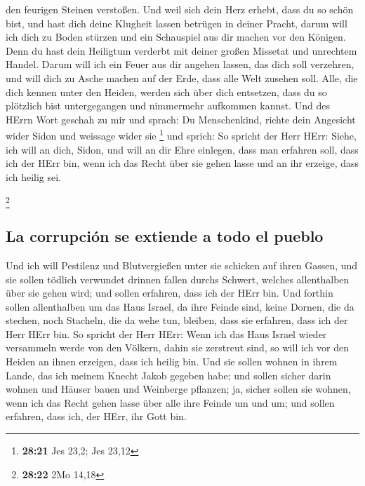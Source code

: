 den feurigen Steinen verstoßen.  Und weil sich dein Herz
erhebt, dass du so schön bist, und hast dich deine Klugheit lassen
betrügen in deiner Pracht, darum will ich dich zu Boden stürzen und ein
Schauspiel aus dir machen vor den Königen.  Denn du hast
dein Heiligtum verderbt mit deiner großen Missetat und unrechtem Handel.
Darum will ich ein Feuer aus dir angehen lassen, das dich soll
verzehren, und will dich zu Asche machen auf der Erde, dass alle Welt
zusehen soll.  Alle, die dich kennen unter den Heiden,
werden sich über dich entsetzen, dass du so plötzlich bist untergegangen
und nimmermehr aufkommen kannst.  Und des HErrn Wort
geschah zu mir und sprach:  Du Menschenkind, richte dein
Angesicht wider Sidon und weissage wider sie \footnote{\textbf{28:21}
  Jes 23,2; Jes 23,12}  und sprich: So spricht der Herr
HErr: Siehe, ich will an dich, Sidon, und will an dir Ehre einlegen,
dass man erfahren soll, dass ich der HErr bin, wenn ich das Recht über
sie gehen lasse und an ihr erzeige, dass ich heilig sei.

\footnote{\textbf{28:22} 2Mo 14,18}

\hypertarget{la-corrupciuxf3n-se-extiende-a-todo-el-pueblo}{%
\subsection{La corrupción se extiende a todo el
pueblo}\label{la-corrupciuxf3n-se-extiende-a-todo-el-pueblo}}

 Und ich will Pestilenz und Blutvergießen unter sie
schicken auf ihren Gassen, und sie sollen tödlich verwundet drinnen
fallen durchs Schwert, welches allenthalben über sie gehen wird; und
sollen erfahren, dass ich der HErr bin.  Und forthin
sollen allenthalben um das Haus Israel, da ihre Feinde sind, keine
Dornen, die da stechen, noch Stacheln, die da wehe tun, bleiben, dass
sie erfahren, dass ich der Herr HErr bin.  So spricht der
Herr HErr: Wenn ich das Haus Israel wieder versammeln werde von den
Völkern, dahin sie zerstreut sind, so will ich vor den Heiden an ihnen
erzeigen, dass ich heilig bin. Und sie sollen wohnen in ihrem Lande, das
ich meinem Knecht Jakob gegeben habe;  und sollen sicher
darin wohnen und Häuser bauen und Weinberge pflanzen; ja, sicher sollen
sie wohnen, wenn ich das Recht gehen lasse über alle ihre Feinde um und
um; und sollen erfahren, dass ich, der HErr, ihr Gott bin.

